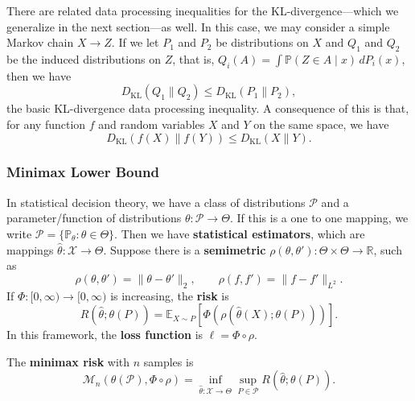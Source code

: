 There are related data processing inequalities for the KL-divergence---which we generalize in the next section---as well. In this case, we may consider a simple Markov chain $X \to Z$. If we let $P_1$ and $P_2$ be distributions on $X$ and $Q_1$ and $Q_2$ be the induced distributions on $Z$, that is, $Q_i(A) = \int \mathbb{P}(Z \in A \mid x) \, dP_i(x)$, then we have
\begin{equation*}
    D_{\mathrm{KL}}(Q_1 \| Q_2) \leq D_{\mathrm{KL}}(P_1 \| P_2),
\end{equation*}
the basic KL-divergence data processing inequality. A consequence of this is that, for any function $f$ and random variables $X$ and $Y$ on the same space, we have
\begin{equation*}
    D_{\mathrm{KL}}(f(X) \| f(Y)) \leq D_{\mathrm{KL}}(X \| Y).
\end{equation*}


\subsubsection{Minimax Lower Bound}
In statistical decision theory, we have a class of distributions $\mathcal{P}$ and a parameter/function of distributions $\theta : \mathcal{P} \to \Theta$. If this is a one to one mapping, we write $\mathcal{P} = \{\mathbb{P}_\theta : \theta \in \Theta\}$. Then we have \textbf{statistical estimators}, which are mappings $\widehat{\theta} : \mathcal{X} \to \Theta$. Suppose there is a \textbf{semimetric} $\rho(\theta, \theta') : \Theta \times \Theta \to \mathbb{R}$, such as
\begin{equation*}
    \rho(\theta, \theta') = \|\theta - \theta'\|_2, \qquad \rho(f, f') = \|f - f'\|_{L^2}.
\end{equation*}
If $\Phi : [0, \infty) \to [0, \infty)$ is increasing, the \textbf{risk} is
\begin{equation*}
    R(\widehat{\theta}; \theta(P)) = \mathbb{E}_{X \sim P}[\Phi(\rho(\widehat{\theta}(X); \theta(P)))].
\end{equation*}
In this framework, the \textbf{loss function} is $\ell = \Phi \circ \rho$.

\begin{defn}
    The \textbf{minimax risk} with $n$ samples is
    \begin{equation*}
        \mathcal{M}_n(\theta(\mathcal{P}), \Phi \circ \rho) = \inf_{\widehat{\theta} : \mathcal{X} \to \Theta} \sup_{P \in \mathcal{P}} R(\widehat{\theta}; \theta(P)).
    \end{equation*}
\end{defn}

